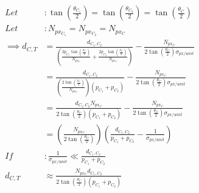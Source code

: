 \documentclass{article}
\begin{document}
	\begin{align}
		Let &: \tan \left(\frac{\theta_{C_{1}}}{2}\right) = \tan \left(\frac{\theta_{C_{2}}}{2}\right) = \tan \left(\frac{\theta_{C}}{2}\right) \\
		Let &: N_{px_{C_{1}}} = N_{px_{C_{2}}} = N_{px_{C}} \\
		\implies d_{C, T} &= \frac{d_{C_{1}, C_{2}}}{\left(\frac{2 p_{C_{1}} \tan \left(\frac{\theta_{C}}{2}\right)}{N_{px_{C}}} + \frac{2 p_{C_{2}} \tan \left(\frac{\theta_{C}}{2}\right)}{N_{px_{C}}}\right)} - \frac{N_{px_{C}}}{2 \tan \left(\frac{\theta_{C}}{2}\right) \sigma_{px / unit}} \\
		&= \frac{d_{C_{1}, C_{2}}}{\left(\frac{2 \tan \left(\frac{\theta_{C}}{2}\right)}{N_{px_{C}}}\right) \left(p_{C_{1}} + p_{C_{2}}\right)} - \frac{N_{px_{C}}}{2 \tan \left(\frac{\theta_{C}}{2}\right) \sigma_{px / unit}} \\
		&= \frac{d_{C_{1}, C_{2}} N_{px_{C}}}{2 \tan \left(\frac{\theta_{C}}{2}\right) \left(p_{C_{1}} + p_{C_{2}}\right)} - \frac{N_{px_{C}}}{2 \tan \left(\frac{\theta_{C}}{2}\right) \sigma_{px / unit}} \\
		&= \left(\frac{N_{px_{C}}}{2 \tan \left(\frac{\theta_{C}}{2}\right)}\right) \left(\frac{d_{C_{1}, C_{2}}}{p_{C_{1}} + p_{C_{2}}} - \frac{1}{\sigma_{px / unit}}\right) \\
		If &: \frac{1}{\sigma_{px/unit}} \ll \frac{d_{C_{1}, C_{2}}}{p_{C_{1}} + p_{C_{2}}} \\
		d_{C, T} &\approx \frac{N_{px_{C}} d_{C_{1}, C_{2}}}{2 \tan \left(\frac{\theta_{C}}{2}\right) \left(p_{C_{1}} + p_{C_{2}}\right)}
	\end{align}
\end{document}
